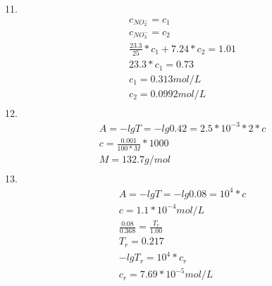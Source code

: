 \documentclass{article}
\begin{document}
11.\begin{equation}
    \begin{multlined}
        c_{NO_2^-} = c_1\\
        c_{NO_3^-} = c_2\\
        \frac{23.3}{25}*c_1 + 7.24*c_2 = 1.01\\
        23.3*c_1 = 0.73\\
        c_1 = 0.313 mol/L\\
        c_2 = 0.0992 mol/L\\
    \end{multlined}
\end{equation}
12.\begin{equation}
    \begin{multlined}
        A = -lgT = -lg0.42 = 2.5*10^{-3}*2*c\\
        c = \frac{0.001}{100*M}*1000\\
        M = 132.7 g/mol\\
    \end{multlined}
\end{equation}
13.\begin{equation}
    \begin{multlined}
        A = -lgT = -lg0.08 = 10^4*c\\
        c = 1.1*10^{-4} mol/L\\
        \frac{0.08}{0.368} = \frac{T_r}{1.00}\\
        T_r = 0.217\\
        -lgT_r = 10^4*c_r\\
        c_r = 7.69*10^{-5} mol/L\\
    \end{multlined}
\end{equation}
\end{document}

